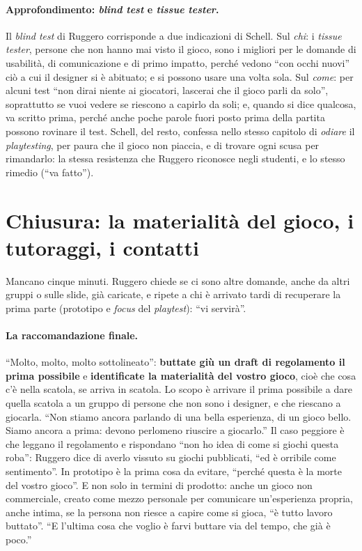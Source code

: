 \paragraph{Approfondimento: \emph{blind test} e \emph{tissue tester}.} Il \emph{blind test}
di Ruggero corrisponde a due indicazioni di Schell. Sul \emph{chi}: i \emph{tissue tester},
persone che non hanno mai visto il gioco, sono i migliori per le domande di usabilità, di
comunicazione e di primo impatto, perché vedono ``con occhi nuovi'' ciò a cui il designer
si è abituato; e si possono usare una volta sola. Sul \emph{come}: per alcuni test
``non dirai niente ai giocatori, lascerai che il gioco parli da solo'', soprattutto se vuoi
vedere se riescono a capirlo da soli; e, quando si dice qualcosa, va scritto prima, perché
anche poche parole fuori posto prima della partita possono rovinare il test. Schell, del
resto, confessa nello stesso capitolo di \emph{odiare} il \emph{playtesting}, per paura che
il gioco non piaccia, e di trovare ogni scusa per rimandarlo: la stessa resistenza che
Ruggero riconosce negli studenti, e lo stesso rimedio (``va fatto'').

\section{Chiusura: la materialità del gioco, i tutoraggi, i contatti}
\label{a12:sec:chiusura}

Mancano cinque minuti. Ruggero chiede se ci sono altre domande, anche da altri gruppi o
sulle slide, già caricate, e ripete a chi è arrivato tardi di recuperare la prima parte
(prototipo e \emph{focus} del \emph{playtest}): ``vi servirà''.

\paragraph{La raccomandazione finale.} ``Molto, molto, molto sottolineato'': \textbf{buttate
giù un draft di regolamento il prima possibile} e \textbf{identificate la materialità del
vostro gioco}, cioè che cosa c'è nella scatola, se arriva in scatola. Lo scopo è arrivare
il prima possibile a dare quella scatola a un gruppo di persone che non sono i designer, e
che riescano a giocarla. ``Non stiamo ancora parlando di una bella esperienza, di un gioco
bello. Siamo ancora a prima: devono perlomeno riuscire a giocarlo.'' Il caso peggiore è
che leggano il regolamento e rispondano ``non ho idea di come si giochi questa roba'':
Ruggero dice di averlo vissuto su giochi pubblicati, ``ed è orribile come sentimento''. In
prototipo è la prima cosa da evitare, ``perché questa è la morte del vostro gioco''. E non
solo in termini di prodotto: anche un gioco non commerciale, creato come mezzo personale
per comunicare un'esperienza propria, anche intima, se la persona non riesce a capire
come si gioca, ``è tutto lavoro buttato''. ``E l'ultima cosa che voglio è farvi buttare
via del tempo, che già è poco.''

